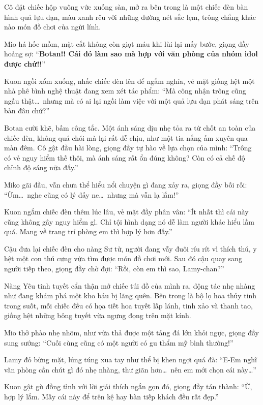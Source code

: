 \documentclass[../main.tex]{subfiles}
\begin{document}
Cô đặt chiếc hộp vuông vức xuống sàn, mở ra bên trong là một chiếc đèn bàn hình quả lựu đạn, màu xanh rêu với những đường nét sắc lẹm, trông chẳng khác nào món đồ chơi của ngừi lính.

Mio há hốc mồm, mặt cắt không còn giọt máu khi lùi lại mấy bước, giọng đầy hoảng sợ: ``\textbf{Botan!! Cái đó làm sao mà hợp với văn phòng của nhóm idol được chứ!!}''

Kuon ngồi xổm xuống, nhấc chiếc đèn lên để ngắm nghía, vẻ mặt giống hệt một nhà phê bình nghệ thuật đang xem xét tác phẩm: ``Mà công nhận trông cũng ngầu thật\dots\ nhưng mà có ai lại ngồi làm việc với một quả lựu đạn phát sáng trên bàn đâu chứ?''

Botan cười khẽ, bấm công tắc. Một ánh sáng dịu nhẹ tỏa ra từ chốt an toàn của chiếc đèn, không quá chói mà lại rất dễ chịu, như một tia nắng ấm xuyên qua màn đêm. Cô gật đầu hài lòng, giọng đầy tự hào về lựa chọn của mình: ``Trông có vẻ nguy hiểm thế thôi, mà ánh sáng rất ổn đúng không? Còn có cả chế độ chỉnh độ sáng nữa đấy.''

Miko gãi đầu, vẫn chưa thể hiểu nổi chuyện gì đang xảy ra, giọng đầy bối rối: ``Ừm\dots\ nghe cũng có lý đấy ne\dots\ nhưng mà vẫn lạ lắm!''

Kuon ngắm chiếc đèn thêm lúc lâu, vẻ mặt đầy phân vân: ``Ít nhất thì cái này cũng không gây nguy hiểm gì. Chỉ tội hình dạng nó dễ làm người khác hiểu lầm quá. Mang về trang trí phòng em thì hợp lý hơn đấy.''

Cậu đưa lại chiếc đèn cho nàng Sư tử, người đang vẫy đuôi ríu rít vì thích thú, y hệt một con thú cưng vừa tìm được món đồ chơi mới. Sau đó cậu quay sang người tiếp theo, giọng đầy chờ đợi: ``Rồi, còn em thì sao, Lamy-chan?''

Nàng Yêu tinh tuyết cẩn thận mở chiếc túi đồ của mình ra, động tác nhẹ nhàng như đang khám phá một kho báu bị lãng quên. Bên trong là bộ lọ hoa thủy tinh trong suốt, mỗi chiếc đều có họa tiết hoa tuyết lấp lánh, tinh xảo và thanh tao, giống hệt những bông tuyết vừa ngưng đọng trên mặt kính.

Mio thở phào nhẹ nhõm, như vừa thả được một tảng đá lớn khỏi ngực, giọng đầy sung sướng: ``Cuối cùng cũng có một người có gu thẩm mỹ bình thường!''

Lamy đỏ bừng mặt, lúng túng xua tay như thể bị khen ngợi quá đà: ``E-Em nghĩ văn phòng cần chút gì đó nhẹ nhàng, thư giãn hơn\dots\ nên em mới chọn cái này\dots''

Kuon gật gù đồng tình với lời giải thích ngắn gọn đó, giọng đầy tán thành: ``Ừ, hợp lý lắm. Mấy cái này để trên kệ hay bàn tiếp khách đều rất đẹp.''
\end{document}
